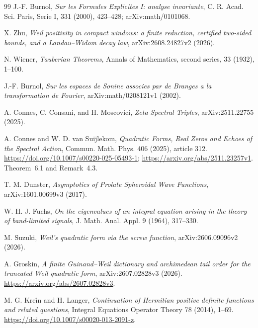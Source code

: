 \documentclass[11pt]{article}
\theoremstyle{remark}
\begin{document}
\begin{thebibliography}{99}
\small
\setlength{\itemsep}{2pt}
J.-F. Burnol,
\emph{Sur les Formules Explicites I: analyse invariante},
C. R. Acad. Sci. Paris, Serie I, 331 (2000), 423--428;
arXiv:math/0101068.

X. Zhu,
\emph{Weil positivity in compact windows: a finite reduction,
certified two-sided bounds, and a Landau--Widom decay law},
arXiv:2608.24827v2 (2026).

N. Wiener,
\emph{Tauberian Theorems},
Annals of Mathematics, second series, 33 (1932), 1--100.



J.-F. Burnol,
\emph{Sur les espaces de Sonine associes par de Branges a la transformation de Fourier},
arXiv:math/0208121v1 (2002).









A. Connes, C. Consani, and H. Moscovici,
\emph{Zeta Spectral Triples},
arXiv:2511.22755 (2025).

A. Connes and W. D. van Suijlekom,
\emph{Quadratic Forms, Real Zeros and Echoes of the Spectral Action},
Commun. Math. Phys. 406 (2025), article 312.
\url{https://doi.org/10.1007/s00220-025-05493-1};
\url{https://arxiv.org/abs/2511.23257v1}.
Theorem~6.1 and Remark~4.3.

T. M. Dunster,
\emph{Asymptotics of Prolate Spheroidal Wave Functions},
arXiv:1601.00699v3 (2017).

W. H. J. Fuchs,
\emph{On the eigenvalues of an integral equation arising in the theory of band-limited signals},
J. Math. Anal. Appl. 9 (1964), 317--330.



M. Suzuki,
\emph{Weil's quadratic form via the screw function},
arXiv:2606.09096v2 (2026).

A. Groskin,
\emph{A finite Guinand--Weil dictionary and archimedean tail order for the
truncated Weil quadratic form},
arXiv:2607.02828v3 (2026).
\url{https://arxiv.org/abs/2607.02828v3}.

M. G. Kre\u{\i}n and H. Langer,
\emph{Continuation of Hermitian positive definite functions and related
questions},
Integral Equations Operator Theory 78 (2014), 1--69.
\url{https://doi.org/10.1007/s00020-013-2091-z}.


\end{thebibliography}
\end{document}
